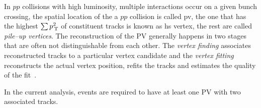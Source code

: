 In $pp$ collisions with high luminosity, multiple interactions occur on a given
bunch crossing, the spatial location of the a $pp$ collision is called \gls{pv},
the one that has the highest $\sum p_\mathrm{\, T}^2$ of constituent tracks is known as
\gls{hs} vertex, the rest are called \emph{pile--up vertices}. The
reconstruction of the PV generally happens in two stages that are often not
distinguishable from each other. The \emph{vertex finding} associates
reconstructed tracks to a particular vertex candidate and the \emph{vertex
  fitting} reconstructs the actual vertex position, refits the tracks and
estimates the quality of the fit~\cite{PV}.

In the current analysis, events are required to have at least one PV with two
associated tracks.

